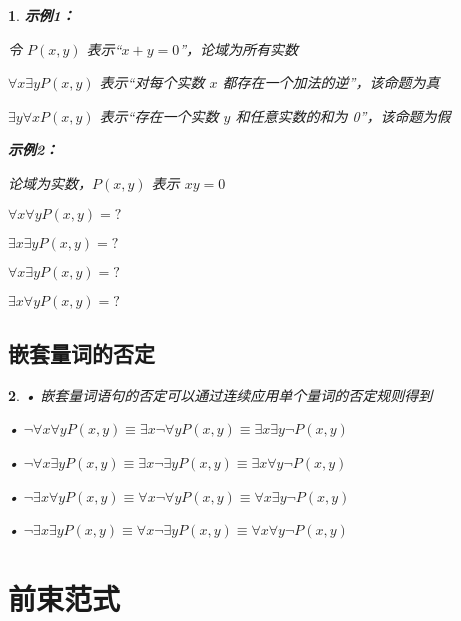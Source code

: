\documentclass[UTF8]{report}
\theoremstyle{MyLineTheoremStyle} %
\theoremstyle{MyBlockTheoremStyle} %
\theoremstyle{MySubsubsectionStyle} %
\newtheorem{definition}{}
\begin{document}
\begin{definition}
    \textbf{示例1：}\par
    令 $P(x, y)$ 表示“$x + y = 0$”，论域为所有实数\par
    $\forall x \exists y P(x, y)$ 表示“对每个实数 $x$ 都存在一个加法的逆”，该命题为真\par
    $\exists y \forall x P(x, y)$ 表示“存在一个实数 $y$ 和任意实数的和为 0”，该命题为假\par
    \vspace{1em} %
    \textbf{示例2：}\par
    论域为实数，$P(x, y)$ 表示 $xy = 0$\par
    $\forall x \forall y P(x, y) = ?$\par
    $\exists x \exists y P(x, y) = ?$\par
    $\forall x \exists y P(x, y) = ?$\par
    $\exists x \forall y P(x, y) = ?$\par
\end{definition}

\subsection{嵌套量词的否定}

\begin{definition}
    • 嵌套量词语句的否定可以通过连续应用单个量词的否定规则得到\par
    • $\neg \forall x \forall y P(x, y) \equiv \exists x \neg \forall y P(x, y) \equiv \exists x \exists y \neg P(x, y)$\par
    • $\neg \forall x \exists y P(x, y) \equiv \exists x \neg \exists y P(x, y) \equiv \exists x \forall y \neg P(x, y)$\par
    • $\neg \exists x \forall y P(x, y) \equiv \forall x \neg \forall y P(x, y) \equiv \forall x \exists y \neg P(x, y)$\par
    • $\neg \exists x \exists y P(x, y) \equiv \forall x \neg \exists y P(x, y) \equiv \forall x \forall y \neg P(x, y)$\par
\end{definition}


\section{前束范式}
\end{document}
